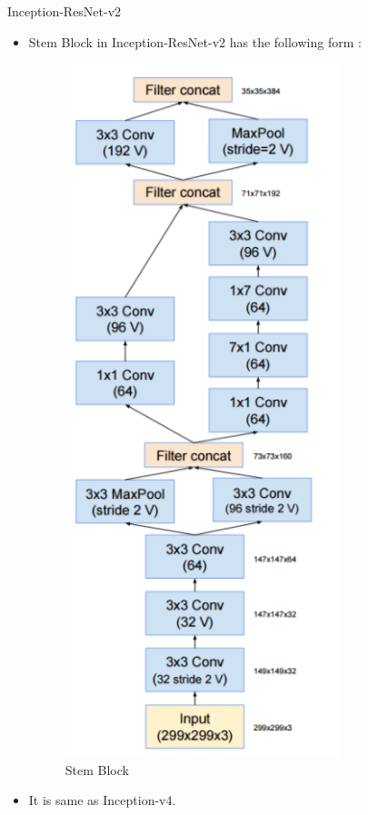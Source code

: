 \documentclass{beamer}
\begin{document}
\begin{frame}{Inception-ResNet-v2}
	\begin{itemize}
		\item Stem Block in Inception-ResNet-v2 has the following form :
		\vspace{7pt}
		\begin{figure}[h]		
			\centering
			\includegraphics[scale=0.33]{./in_res_v2/stem.PNG}
			\caption{Stem Block}
			\label{steminresv2}
		\end{figure}
		\item It is same as Inception-v4.
	\end{itemize}
\end{frame}
\end{document}
